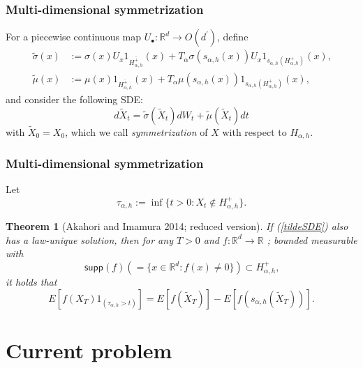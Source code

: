 \documentclass[dvipdfmx,11pt]{beamer}		%
\newtheorem{thm}[defi]{Theorem}
\newcommand{\R}{\mathbb{R}}
\begin{document}
%
\begin{frame}\frametitle{Multi-dimensional symmetrization}
	For a piecewise continuous map \( U_{\bullet} \colon \R^d \to O(d^\prime) \), define
	\begin{align*}
		\tilde{\sigma}(x) & := \sigma(x)U_x 1_{ \overline{H_{\alpha,h}^+} }(x) + T_\alpha \sigma(s_{\alpha,h}(x)) U_x 1_{ s_{\alpha,h}( H_{\alpha,h}^+ ) }(x)\text{,}\\
		\tilde{\mu}(x) & := \mu(x) 1_{ \overline{H_{\alpha,h}^+} }(x) + T_\alpha \mu(s_{\alpha,h}(x)) 1_{ s_{\alpha,h}( H_{\alpha,h}^+ ) }(x)\text{,}
	\end{align*}
	and consider the following SDE:
	\[\label{tildeSDE}
		d\tilde{X}_t = \tilde{\sigma}( \tilde{X}_t ) dW_t + \tilde{\mu}( \tilde{X}_t ) dt	\tag{b}
	\]
	with \( \tilde{X}_0 = X_0 \), which we call \emph{symmetrization} of \( X \) with respect to \( H_{\alpha,h} \).
\end{frame}
%
\begin{frame}\frametitle{Multi-dimensional symmetrization}
	Let
	\[
		\tau_{\alpha,h} := \inf \{ t>0 \colon X_t \notin H_{\alpha,h}^+ \}\text{.}
	\]
	\begin{thm}[Akahori and Imamura 2014; reduced version]	
		If (\ref{tildeSDE}) also has a law-unique solution, then for any \( T>0 \) and \( f \colon \R^d \to \R \) ; bounded measurable with
		\[
			\mathsf{supp}(f) \left( = \{ x \in \R^d \colon f(x) \neq 0 \} \right) \subset H_{\alpha,h}^+	\text{,}
		\]
		it holds that
		\[
			E[ f(X_T) 1_{(\tau_{\alpha,h}>t)} ] = E[ f(\tilde{X}_T) ] - E[ f(s_{\alpha,h}(\tilde{X}_T)) ]\text{.}
		\]
	\end{thm}
\end{frame}
%
\section{Current problem}
\end{document}
